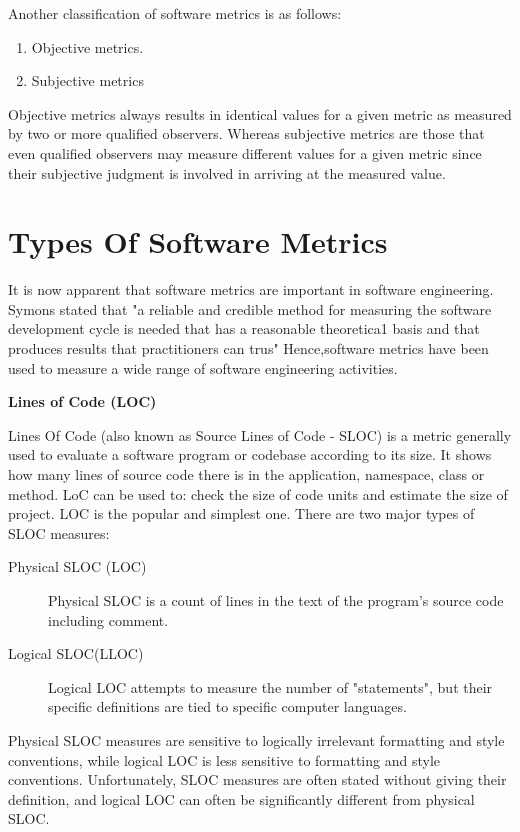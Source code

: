 Another classification of software metrics is as follows:

\begin{enumerate}
	\item Objective metrics.
	\item Subjective metrics
\end{enumerate}

Objective metrics always results in identical values for a given metric as measured by two or more qualified observers. Whereas subjective metrics are those that even qualified observers may measure different values for a given metric since their subjective judgment is involved in arriving at the measured value.

\section{Types Of Software Metrics}
It is now apparent that software metrics are important in software
engineering. Symons stated that "a reliable and credible method
for measuring the software development cycle is needed that has a reasonable
theoretica1 basis and that produces results that practitioners can trus" Hence,software metrics have been used to measure a wide range of software
engineering activities.

\textbf{Lines of Code (LOC)}

Lines Of Code (also known as Source Lines of Code - SLOC) is a metric generally used to
evaluate a software program or codebase according to its size. It shows how many lines of source
code there is in the application, namespace, class or method. LoC can be used to: check the size
of code units and estimate the size of project. LOC is the popular and simplest one.
There are two major types of SLOC measures: 

\begin{description}
	\item[Physical SLOC (LOC)] Physical SLOC is a count of lines in the text of the program's source code including comment.
	\item[Logical SLOC(LLOC)] Logical LOC attempts to measure the number of "statements", but their specific definitions are tied to specific computer languages.
\end{description}

Physical SLOC measures are sensitive to logically irrelevant formatting and style conventions, while logical LOC is less sensitive to formatting and style conventions. Unfortunately, SLOC measures are often stated without giving their definition, and logical LOC can often be significantly different from physical SLOC.

